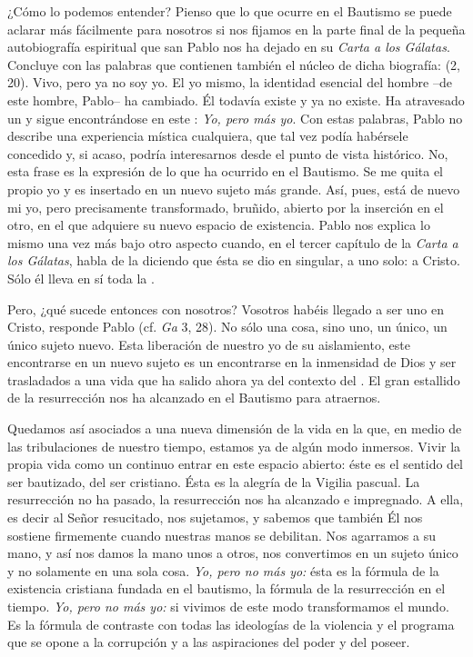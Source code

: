\begin{body}
¿Cómo lo podemos entender? Pienso que lo que ocurre en el Bautismo se puede aclarar más fácilmente para nosotros si nos fijamos en la parte final de la pequeña autobiografía espiritual que san Pablo nos ha dejado en su \textit{Carta a los Gálatas}. Concluye con las palabras que contienen también el núcleo de dicha biografía:  (2, 20). Vivo, pero ya no soy yo. El yo mismo, la identidad esencial del hombre –de este hombre, Pablo– ha cambiado. Él todavía existe y ya no existe. Ha atravesado un  y sigue encontrándose en este : \textit{Yo, pero  más yo}. Con estas palabras, Pablo no describe una experiencia mística cualquiera, que tal vez podía habérsele concedido y, si acaso, podría interesarnos desde el punto de vista histórico. No, esta frase es la expresión de lo que ha ocurrido en el Bautismo. Se me quita el propio yo y es insertado en un nuevo sujeto más grande. Así, pues, está de nuevo mi yo, pero precisamente transformado, bruñido, abierto por la inserción en el otro, en el que adquiere su nuevo espacio de existencia. Pablo nos explica lo mismo una vez más bajo otro aspecto cuando, en el tercer capítulo de la \textit{Carta a los Gálatas}, habla de la  diciendo que ésta se dio en singular, a uno solo: a Cristo. Sólo él lleva en sí toda la .

Pero, ¿qué sucede entonces con nosotros? Vosotros habéis llegado a ser uno en Cristo, responde Pablo (cf. \textit{Ga} 3, 28). No sólo una cosa, sino uno, un único, un único sujeto nuevo. Esta liberación de nuestro yo de su aislamiento, este encontrarse en un nuevo sujeto es un encontrarse en la inmensidad de Dios y ser trasladados a una vida que ha salido ahora ya del contexto del . El gran estallido de la resurrección nos ha alcanzado en el Bautismo para atraernos.

Quedamos así asociados a una nueva dimensión de la vida en la que, en medio de las tribulaciones de nuestro tiempo, estamos ya de algún modo inmersos. Vivir la propia vida como un continuo entrar en este espacio abierto: éste es el sentido del ser bautizado, del ser cristiano. Ésta es la alegría de la Vigilia pascual. La resurrección no ha pasado, la resurrección nos ha alcanzado e impregnado. A ella, es decir al Señor resucitado, nos sujetamos, y sabemos que también Él nos sostiene firmemente cuando nuestras manos se debilitan. Nos agarramos a su mano, y así nos damos la mano unos a otros, nos convertimos en un sujeto único y no solamente en una sola cosa. \textit{Yo, pero no más yo:} ésta es la fórmula de la existencia cristiana fundada en el bautismo, la fórmula de la resurrección en el tiempo. \textit{Yo, pero no más yo:} si vivimos de este modo transformamos el mundo. Es la fórmula de contraste con todas las ideologías de la violencia y el programa que se opone a la corrupción y a las aspiraciones del poder y del poseer.


\end{body}
